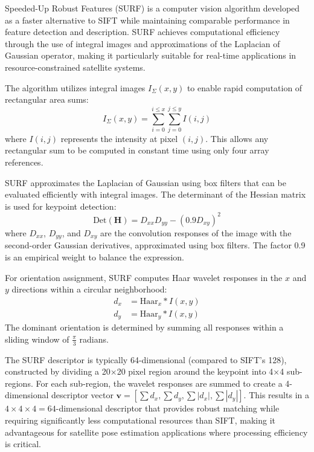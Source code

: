 
Speeded-Up Robust Features (SURF) is a computer vision algorithm developed as a faster alternative to SIFT while maintaining comparable performance 
in feature detection and description. SURF achieves computational efficiency through the use of integral images and approximations of the Laplacian of 
Gaussian operator, making it particularly suitable for real-time applications in resource-constrained satellite systems.

The algorithm utilizes integral images $I_{\Sigma}(x,y)$ to enable rapid computation of rectangular area sums:
\begin{equation}
I_{\Sigma}(x,y) = \sum_{i=0}^{i \leq x} \sum_{j=0}^{j \leq y} I(i,j)
\end{equation}
where $I(i,j)$ represents the intensity at pixel $(i,j)$. This allows any rectangular sum to be computed in constant time using only four array references.

SURF approximates the Laplacian of Gaussian using box filters that can be evaluated efficiently with integral images. The determinant of the Hessian matrix is used for keypoint detection:
\begin{equation}
\text{Det}(\mathbf{H}) = D_{xx}D_{yy} - (0.9D_{xy})^2
\end{equation}
where $D_{xx}$, $D_{yy}$, and $D_{xy}$ are the convolution responses of the image with the second-order Gaussian derivatives, approximated using box filters. The factor 0.9 is an empirical weight to balance the expression.

For orientation assignment, SURF computes Haar wavelet responses in the $x$ and $y$ directions within a circular neighborhood:
\begin{align}
d_x &= \text{Haar}_x * I(x,y) \\
d_y &= \text{Haar}_y * I(x,y)
\end{align}
The dominant orientation is determined by summing all responses within a sliding window of $\frac{\pi}{3}$ radians.

The SURF descriptor is typically 64-dimensional (compared to SIFT's 128), constructed by dividing a 20×20 pixel region around the keypoint into 4×4 sub-regions. 
For each sub-region, the wavelet responses are summed to create a 4-dimensional descriptor vector $\mathbf{v} = [\sum d_x, \sum d_y, \sum |d_x|, \sum |d_y|]$. 
This results in a $4 \times 4 \times 4 = 64$-dimensional descriptor that provides robust matching while requiring significantly less computational resources 
than SIFT, making it advantageous for satellite pose estimation applications where processing efficiency is critical.

